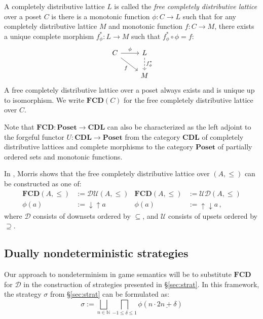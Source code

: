 \documentclass[format=sigplan,authordraft]{acmart}
\begin{document}
A completely distributive lattice $L$ is called the
\emph{free completely distributive lattice}
over a poset $C$ is there is
a monotonic function $\phi : C \rightarrow L$
such that
for any completely distributive lattice $M$
and monotonic function $f : C \rightarrow M$,
there exists a unique complete morphism $f^*_\phi : L \rightarrow M$
such that $f^*_\phi \circ \phi = f$:
\[
  \begin{tikzcd}
    C \arrow[r, "\phi"] \arrow[rd, "f"'] &
    L \arrow[d, "f^*_\phi", dashed] \\ & M
  \end{tikzcd}
\]
A free completely distributive lattice over a poset
always exists and is unique up to isomorphism.
We write $\mathbf{FCD}(C)$ for
the free completely distributive lattice over $C$.

Note that $\mathbf{FCD} : \mathbf{Poset} \rightarrow \mathbf{CDL}$
can also be characterized as
the left adjoint to the forgeful functor
$U : \mathbf{CDL} \rightarrow \mathbf{Poset}$
from the category $\mathbf{CDL}$
of completely distributive lattices and complete morphisms
to the category $\mathbf{Poset}$
of partially ordered sets and monotonic functions.

In \cite{augtyp}, Morris shows that
the free completely distributive lattice over $(A, \le)$
can be constructed as one of:
\begin{align*}
  \mathbf{FCD}(A, {\le}) &:= \mathcal{D} \mathcal{U}(A, {\le}) &
  \mathbf{FCD}(A, {\le}) &:= \mathcal{U} \mathcal{D}(A, {\le}) \\
  \phi(a) &:= {\downarrow}{\uparrow} a &
  \phi(a) &:= {\uparrow}{\downarrow} a \,,
\end{align*}
where $\mathcal{D}$ consists of
downsets ordered by $\subseteq$,
and $\mathcal{U}$ consists of
upsets ordered by $\supseteq$.


\subsection{Dually nondeterministic strategies} %

Our approach to nondeterminism in game semantics
will be to substitute $\mathbf{FCD}$ for $\mathcal{D}$
in the construction of strategies presented in \S\ref{sec:strat}.
In this framework,
the strategy $\sigma$ from \S\ref{sec:strat}
can be formulated as:
\[
  \sigma :=
    \bigsqcup_{n \in \mathbb{N}}
    \bigsqcap_{-1 \le \delta \le 1}
    \phi(n \cdot \underline{2n + \delta})
\]
\end{document}
